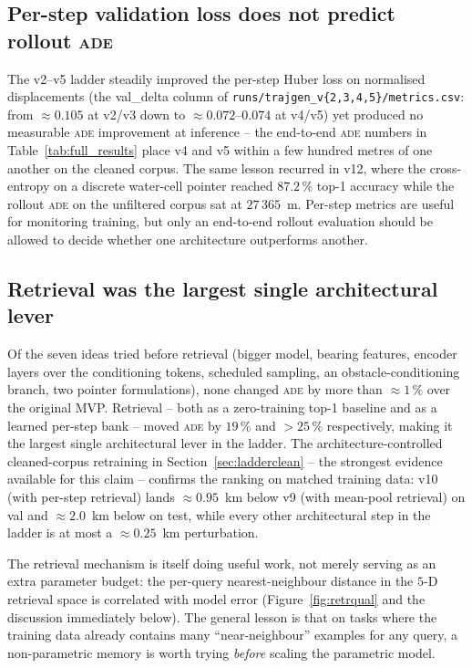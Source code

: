 \documentclass[oneside, a4paper, onecolumn, 11pt]{article}
\newcommand{\ade}{\textsc{ade}}
\begin{document}
\subsection{Per-step validation loss does not predict rollout \ade}

The v2--v5 ladder steadily improved the per-step Huber loss on
normalised displacements (the val\_delta column of
\texttt{runs/trajgen\_v\{2,3,4,5\}/metrics.csv}: from
$\approx 0.105$ at v2/v3 down to $\approx 0.072$--$0.074$ at v4/v5)
yet produced no measurable \ade{} improvement at inference -- the
end-to-end \ade{} numbers in Table~\ref{tab:full_results} place v4
and v5 within a few hundred metres of one another on the cleaned
corpus.  The same lesson recurred in v12, where the cross-entropy on
a discrete water-cell pointer reached $87.2\,\%$ top-1 accuracy
while the rollout \ade{} on the unfiltered corpus sat at
$27\,365$~m.  Per-step metrics are useful for monitoring training,
but only an end-to-end rollout evaluation should be allowed to
decide whether one architecture outperforms another.

\subsection{Retrieval was the largest single architectural lever}
\label{sec:retrievallesson}

Of the seven ideas tried before retrieval (bigger model, bearing
features, encoder layers over the conditioning tokens, scheduled
sampling, an obstacle-conditioning branch, two pointer formulations),
none changed \ade{} by more than $\approx 1\,\%$ over the original
MVP.  Retrieval -- both as a zero-training top-1 baseline and as a
learned per-step bank -- moved \ade{} by $19\,\%$ and $> 25\,\%$
respectively, making it the largest single architectural lever in the
ladder.
The architecture-controlled cleaned-corpus retraining in
Section~\ref{sec:ladderclean} -- the strongest evidence available for
this claim -- confirms the ranking on matched training data: v10
(with per-step retrieval) lands $\approx 0.95$~km below v9 (with
mean-pool retrieval) on val and $\approx 2.0$~km below on test, while
every other architectural step in the ladder is at most a
$\approx 0.25$~km perturbation.

The retrieval mechanism is itself doing useful work, not merely
serving as an extra parameter budget: the per-query nearest-neighbour
distance in the $5$-D retrieval space is correlated with model error
(Figure~\ref{fig:retrqual} and the discussion immediately below).
The general lesson is that on tasks where the training data already
contains many ``near-neighbour'' examples for any query, a
non-parametric memory is worth trying \emph{before} scaling the
parametric model.
\end{document}
